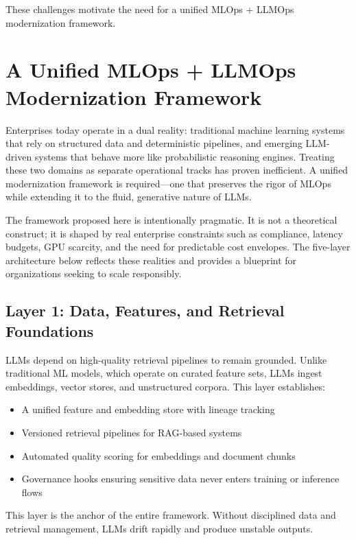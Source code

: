 \documentclass[11pt]{article}
\begin{document}
These challenges motivate the need for a unified MLOps + LLMOps modernization framework.

\section{A Unified MLOps + LLMOps Modernization Framework}

Enterprises today operate in a dual reality: traditional machine learning systems that rely on structured data and deterministic pipelines, and emerging LLM-driven systems that behave more like probabilistic reasoning engines. Treating these two domains as separate operational tracks has proven inefficient. A unified modernization framework is required—one that preserves the rigor of MLOps while extending it to the fluid, generative nature of LLMs.

The framework proposed here is intentionally pragmatic. It is not a theoretical construct; it is shaped by real enterprise constraints such as compliance, latency budgets, GPU scarcity, and the need for predictable cost envelopes. The five-layer architecture below reflects these realities and provides a blueprint for organizations seeking to scale responsibly.

\subsection{Layer 1: Data, Features, and Retrieval Foundations}

LLMs depend on high-quality retrieval pipelines to remain grounded. Unlike traditional ML models, which operate on curated feature sets, LLMs ingest embeddings, vector stores, and unstructured corpora. This layer establishes:

\begin{itemize}[leftmargin=1.2cm]
    \item A unified feature and embedding store with lineage tracking
    \item Versioned retrieval pipelines for RAG-based systems
    \item Automated quality scoring for embeddings and document chunks
    \item Governance hooks ensuring sensitive data never enters training or inference flows
\end{itemize}

This layer is the anchor of the entire framework. Without disciplined data and retrieval management, LLMs drift rapidly and produce unstable outputs.
\end{document}
